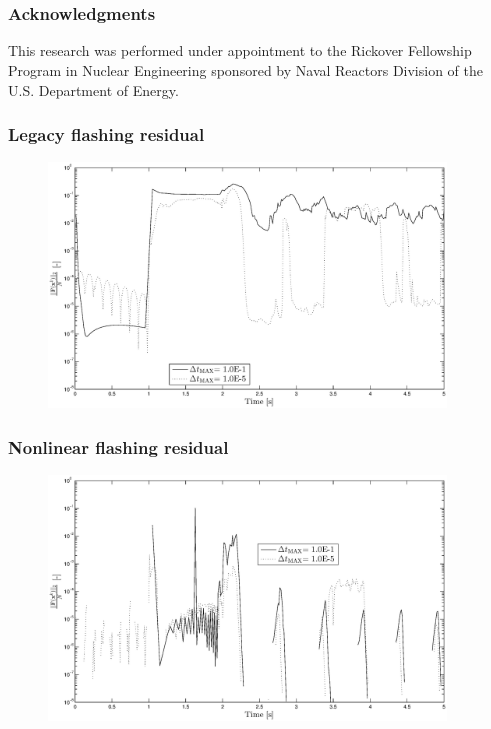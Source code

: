 \documentclass[compress,xcolor=table]{beamer}
\begin{document}
\section*{}
\begin{frame}
\frametitle{Acknowledgments}

This research was performed under appointment to the Rickover Fellowship Program in Nuclear Engineering sponsored by Naval Reactors Division of the U.S. Department of Energy.

\end{frame}
\begin{frame}
\frametitle{Legacy flashing residual}

\begin{figure}[h!t]
\centering
\includegraphics[width=0.94\textwidth]{images/flashing_semilogy_res_compare_lin.eps}
\end{figure}

\end{frame}
\begin{frame}
\frametitle{Nonlinear flashing residual}

\begin{figure}[h!t]
\centering
\includegraphics[width=0.94\textwidth]{images/flashing_semilogy_res_compare_nl.eps}
\end{figure}
\end{frame}
\end{document}
